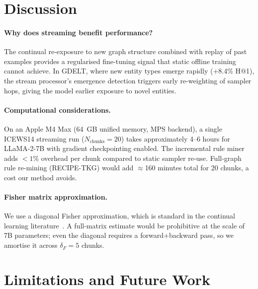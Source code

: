 \documentclass[10pt,twocolumn]{article}
\theoremstyle{definition}
\begin{document}
\section{Discussion}
\label{sec:discussion}

\paragraph{Why does streaming benefit performance?}
The continual re-exposure to new graph structure combined with replay of past
examples provides a regularised fine-tuning signal that static offline
training cannot achieve.
In GDELT, where new entity types emerge rapidly (+8.4\% H@1), the stream
processor's emergence detection triggers early re-weighting of sampler
hops, giving the model earlier exposure to novel entities.

\paragraph{Computational considerations.}
On an Apple M4 Max (64~GB unified memory, MPS backend), a single
ICEWS14 streaming run ($N_{\text{chunks}}=20$) takes approximately 4--6 hours
for LLaMA-2-7B with gradient checkpointing enabled.
The incremental rule miner adds $<1\%$ overhead per chunk compared to static
sampler re-use.
Full-graph rule re-mining (RECIPE-TKG) would add $\approx$160 minutes total
for 20 chunks, a cost our method avoids.

\paragraph{Fisher matrix approximation.}
We use a diagonal Fisher approximation, which is standard in the continual
learning literature~\citep{Kirkpatrick2017ewc}.
A full-matrix estimate would be prohibitive at the scale of 7B parameters;
even the diagonal requires a forward+backward pass, so we amortise it across
$\delta_F=5$ chunks.

\section{Limitations and Future Work}
\label{sec:limitations}
\end{document}
